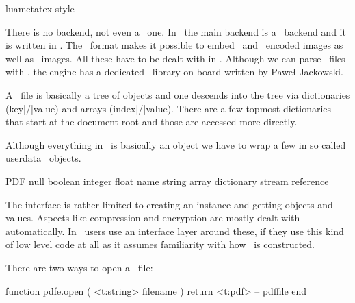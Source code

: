 
\environment luametatex-style

\startdocument[title=PDF]

\startsubject[title=Contents]
    \setups[sectioncontents]
\stopsubject

\startsection[title={Introduction}]

There is no backend, not even a \DVI\ one. In \CONTEXT\ the main backend is a
\PDF\ backend and it is written in \LUA. The \PDF\ format makes it possible to
embed \JPEG\ and \PNG\ encoded images as well as \PDF\ images. All these have to
be dealt with in \LUA. Although we can parse \PDF\ files with \LUA, the engine
has a dedicated \PDF\ library on board written by Paweł Jackowski.

A \PDF\ file is basically a tree of objects and one descends into the tree via
dictionaries (key|/|value) and arrays (index|/|value). There are a few topmost
dictionaries that start at the document root and those are accessed more
directly.

Although everything in \PDF\ is basically an object we have to wrap a few in so
called userdata \LUA\ objects.

\starttabulate[|l|l|]
\FL
\BC PDF        \BC \LUA         \NC \NR
\TL
\NC null             \NC \NR
\NC boolean      \NC \NR
\NC integer      \NC \NR
\NC float         \NC \NR
\NC name          \NC \NR
\NC string        \NC \NR
\NC array       \NC \NR
\NC dictionary  \NC \NR
\NC stream      \NC \NR
\NC reference   \NC \NR
\LL
\stoptabulate

The interface is rather limited to creating an instance and getting objects and
values. Aspects like compression and encryption are mostly dealt with
automatically. In \CONTEXT\ users use an interface layer around these, if they
use this kind of low level code at all as it assumes familiarity with how \PDF\
is constructed.

\stopsection

\startsection[title={\LUA\ interfaces}]

\startsubsection[title={Opening and closing}]

There are two ways to open a \PDF\ file:

\starttyping[option=LUA]
function pdfe.open ( <t:string> filename )
    return <t:pdf>  -- pdffile
end

